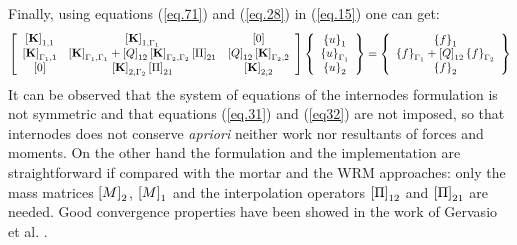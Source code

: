 Finally, using equations (\ref{eq.71}) and (\ref{eq.28}) in (\ref{eq.15}) one can get:
\begin{equation}
\label{eq.72}
\begin{aligned}
\left[ \begin{array}{ccc} 
    \left[{\mathbf{K}}\right]_{1,1} & \left[{\mathbf{K}}\right]_{1,\Gamma_1} & \left[{0}\right] \\
   \left[{\mathbf{K}}\right]_{\Gamma_1,1} & \left[{\mathbf{K}}\right]_{\Gamma_1,\Gamma_1}+ \left[{Q}\right]_{12}\left[{\mathbf{K}}\right]_{\Gamma_2,\Gamma_2}\left[{\Pi}\right]_{21} & \left[{Q}\right]_{12}\left[{\mathbf{K}}\right]_{\Gamma_2,2}\\   
    \left[{0}\right] & \left[{\mathbf{K}}\right]_{2,\Gamma_2}\left[{\Pi}\right]_{21} & \left[{\mathbf{K}}\right]_{2,2}\end{array} \right] \left\lbrace \begin{array}{c} \left\lbrace{u}\right \rbrace_1\\\left\lbrace{u}\right \rbrace_{\Gamma_1}\\\left\lbrace{u}\right \rbrace_2
    \end{array}\right\rbrace= \left\lbrace\begin{array}{c} \left\lbrace{f}\right \rbrace_1\\\left\lbrace{f}\right \rbrace_{\Gamma_1}+\left[{Q}\right]_{12}\left\lbrace{f}\right \rbrace_{\Gamma_2}\\\left\lbrace{f}\right \rbrace_2
    \end{array}\right\rbrace
    \end{aligned}
\end{equation}
It can be observed that the system of equations of the internodes formulation is not symmetric and that equations (\ref{eq.31}) and (\ref{eq32}) are not imposed, so that internodes does not conserve \textit{apriori} neither work nor resultants of forces and moments. On the other hand the formulation and the implementation are straightforward if compared with the mortar and the WRM approaches: only the mass matrices $\left[{M}\right]_2$, $\left[{M}\right]_1$ and the interpolation operators $\left[{\Pi}\right]_{12}$ and $\left[{\Pi}\right]_{21}$ are needed. Good convergence properties have been showed in the work of Gervasio et al. \cite{gervasio2016analysis}.
